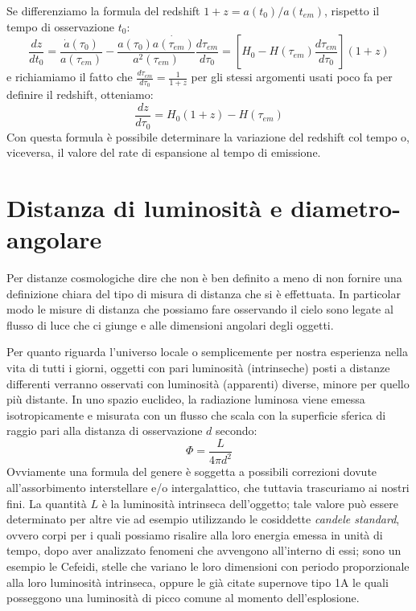 Se differenziamo la formula del redshift $1+z = a(t_0)/a(t_{em})$, rispetto il tempo di osservazione $t_0$:
\begin{equation*}
    \frac{dz}{dt_0} = \frac{\Dot{a}(\tau_0)}{a(\tau_{em})} - \frac{a(\tau_0) \Dot{a(\tau_{em})}}{a^2(\tau_{em})}\frac{d\tau_{em}}{d\tau_0} = \left[H_0 - H(\tau_{em})\frac{d\tau_{em}}{d\tau_0} \right](1+z)
\end{equation*}
e richiamiamo il fatto che $\frac{d\tau_{em}}{d\tau_0} = \frac{1}{1+z}$ per gli stessi argomenti usati poco fa per definire il redshift, otteniamo:
\begin{equation*}
    \frac{dz}{d\tau_0} = H_0(1+z) - H(\tau_{em})
\end{equation*}
Con questa formula è possibile determinare la variazione del redshift col tempo o, viceversa, il valore del rate di espansione al tempo di emissione.
\section{Distanza di luminosità e diametro-angolare}
Per distanze cosmologiche dire che  non è ben definito a meno di non fornire una definizione chiara del tipo di misura di distanza che si è effettuata. In particolar modo le misure di distanza che possiamo fare osservando il cielo sono legate al flusso di luce che ci giunge e alle dimensioni angolari degli oggetti.

Per quanto riguarda l'universo locale o semplicemente per nostra esperienza nella vita di tutti i giorni, oggetti con pari luminosità (intrinseche) posti a distanze differenti verranno osservati con luminosità (apparenti) diverse, minore per quello più distante. In uno spazio euclideo, la radiazione luminosa viene emessa isotropicamente e misurata con un flusso che scala con la superficie sferica di raggio pari alla distanza di osservazione $d$ secondo:
\begin{equation*}
    \Phi = \frac{L}{4\pi d^2}
\end{equation*}
Ovviamente una formula del genere è soggetta a possibili correzioni dovute all'assorbimento interstellare e/o intergalattico, che tuttavia trascuriamo ai nostri fini.
La quantità $L$ è la luminosità intrinseca dell'oggetto; tale valore può essere determinato per altre vie ad esempio utilizzando le cosiddette \emph{candele standard}, ovvero corpi per i quali possiamo risalire alla loro energia emessa in unità di tempo, dopo aver analizzato fenomeni  che avvengono all'interno di essi; sono un esempio le Cefeidi, stelle che variano le loro dimensioni con periodo proporzionale alla loro luminosità intrinseca, oppure le già citate supernove tipo 1A le quali posseggono una luminosità di picco comune al momento dell'esplosione.

